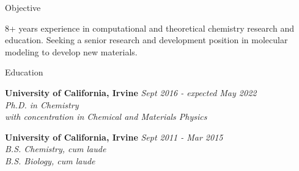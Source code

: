 \documentclass{resume} %
\begin{document}
{\centerline { } }
\vspace{-0.3in}
\begin{rSection}{Objective}
  
  8+ years experience in computational and theoretical chemistry research and education.
  Seeking a senior research and development position in molecular modeling to develop new
  materials. 

\end{rSection}

\begin{rSection}{Education}

{\bf University of California, Irvine} \hfill {\em Sept 2016 - expected May 2022} 
\\{\textit{Ph.D. in Chemistry \\
    with concentration in Chemical and Materials Physics}}

{\bf University of California, Irvine} \hfill {\em Sept 2011 - Mar 2015} 
\\ { \textit{B.S. Chemistry, cum laude}} \hfill
\\ { \textit{B.S. Biology, cum laude}} \hfill

\end{rSection}
\end{document}
